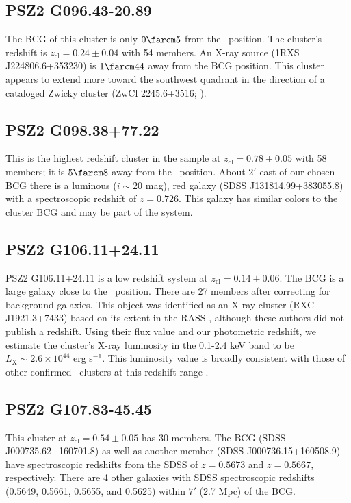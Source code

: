 \documentclass[apj, revtex4-1]{emulateapj}
\begin{document}
\subsection{PSZ2 G096.43-20.89} %
The BCG of this cluster is only $0\farcm5$ from the \planck\ position. The cluster's redshift is $z_\mathrm{cl} = 0.24 \pm 0.04$ with 54 members. An X-ray source (1RXS J224806.6+353230) is $1\farcm44$ away from the BCG position. This cluster appears to extend more toward the southwest quadrant in the direction of a cataloged Zwicky cluster (ZwCl 2245.6+3516; \citealt{Zwicky1968}).

\subsection{PSZ2 G098.38+77.22} %
This is the highest redshift cluster in the sample at $z_\mathrm{cl} = 0.78 \pm 0.05$ with 58 members; it is $5\farcm8$ away from the \planck\ position. About $2'$ east of our chosen BCG there is a luminous ($i\sim 20$ mag), red galaxy (SDSS J131814.99+383055.8) with a spectroscopic redshift of $z=0.726$. This galaxy has similar colors to the cluster BCG and may be part of the system.

\subsection{PSZ2 G106.11+24.11} %
PSZ2 G106.11+24.11 is a low redshift system at $z_\mathrm{cl} = 0.14 \pm 0.06$. The BCG is a large galaxy close to the \planck\ position. There are 27 members after correcting for background galaxies. This object was identified as an X-ray cluster (RXC J1921.3+7433) based on its extent in the RASS \citep{Bohringer2000}, although these authors did not publish a redshift. Using their flux value and our photometric redshift, we estimate the cluster's X-ray luminosity in the 0.1-2.4 keV band to be $L_\mathrm{X} \sim 2.6\times 10^{44}$ erg s$^{-1}$. This luminosity value is broadly consistent with those of other confirmed \planck\ clusters at this redshift range \citep{PlanckCollaboration2015}.

\subsection{PSZ2 G107.83-45.45} %
This cluster at $z_\mathrm{cl} = 0.54 \pm 0.05$ has 30 members. The BCG (SDSS J000735.62+160701.8) as well as another member (SDSS J000736.15+160508.9) have spectroscopic redshifts from the SDSS of $z=0.5673$ and $z=0.5667$, respectively. There are 4 other galaxies with SDSS spectroscopic redshifts (0.5649, 0.5661, 0.5655, and 0.5625) within $7'$ (2.7 Mpc) of the BCG.
\end{document}
